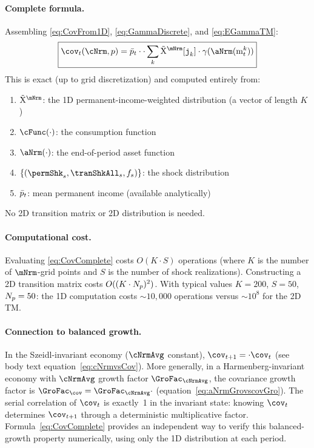 \documentclass[\econtexRoot/BufferStockTheory]{subfiles}
\begin{document}
\paragraph{Complete formula.}
Assembling \eqref{eq:CovFrom1D}, \eqref{eq:GammaDiscrete}, and \eqref{eq:EGammaTM}:
\begin{equation}\begin{gathered}\begin{aligned} \label{eq:CovComplete}
\boxed{\cov_{t}(\cNrm, \permLvlPrb) = \bar{\permLvlPrb}_{t} \cdot \PermGroFac \cdot \sum_{k} \mpMatMargWgt[\nmNrmVecNow_{k}] \cdot \gamma(\aNrm(\mNrmVec_{t}^{k}))}
\end{aligned}\end{gathered}\end{equation}
This is exact (up to grid discretization) and computed entirely from:
\begin{enumerate}
\item $\mpMatMargWgt$: the 1D permanent-income-weighted distribution (a vector of length $K$)
\item $\cFunc(\cdot)$: the consumption function
\item $\aNrm(\cdot)$: the end-of-period asset function
\item $\{(\permShk_{s}, \tranShkAll_{s}, f_{s})\}$: the shock distribution
\item $\bar{p}_{t}$: mean permanent income (available analytically)
\end{enumerate}
No 2D transition matrix or 2D distribution is needed.

\paragraph{Computational cost.}
Evaluating \eqref{eq:CovComplete} costs $O(K \cdot S)$ operations (where $K$ is the number of $\mNrm$-grid points and $S$ is the number of shock realizations). Constructing a 2D transition matrix costs $O((K \cdot N_{p})^{2})$. With typical values $K = 200$, $S = 50$, $N_{p} = 50$: the 1D computation costs $\sim 10{,}000$ operations versus $\sim 10^{8}$ for the 2D TM.

\paragraph{Connection to balanced growth.}
In the Szeidl-invariant economy ($\cNrmAvg$ constant), $\cov_{t+1} = \PermGroFac \cdot \cov_{t}$ (see body text equation~\eqref{eq:cNrmvsCov}). More generally, in a Harmenberg-invariant economy with $\cNrmAvg$ growth factor $\GroFac_{\cNrmAvg}$, the covariance growth factor is $\GroFac_{\cov} = \GroFac_{\cNrmAvg} \cdot \PermGroFac$ (equation~\eqref{eq:aNrmGrovscovGro}). The serial correlation of $\cov_{t}$ is exactly~1 in the invariant state: knowing $\cov_{t}$ determines $\cov_{t+1}$ through a deterministic multiplicative factor. Formula~\eqref{eq:CovComplete} provides an independent way to verify this balanced-growth property numerically, using only the 1D distribution at each period.
\end{document}
